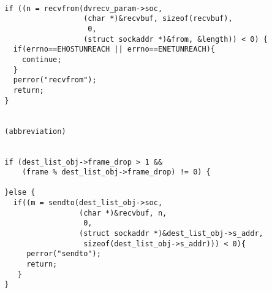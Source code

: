 \begin{verbatim}

  if ((n = recvfrom(dvrecv_param->soc,
                    (char *)&recvbuf, sizeof(recvbuf),
                     0,
                    (struct sockaddr *)&from, &length)) < 0) {
    if(errno==EHOSTUNREACH || errno==ENETUNREACH){
      continue;
    } 
    perror("recvfrom");
    return;
  }


  (abbreviation)


  if (dest_list_obj->frame_drop > 1 &&
      (frame % dest_list_obj->frame_drop) != 0) {

  }else {
    if((m = sendto(dest_list_obj->soc,
                   (char *)&recvbuf, n,
                    0,
                   (struct sockaddr *)&dest_list_obj->s_addr,
                    sizeof(dest_list_obj->s_addr))) < 0){
       perror("sendto");
       return;
     }
  }

\end{verbatim}
